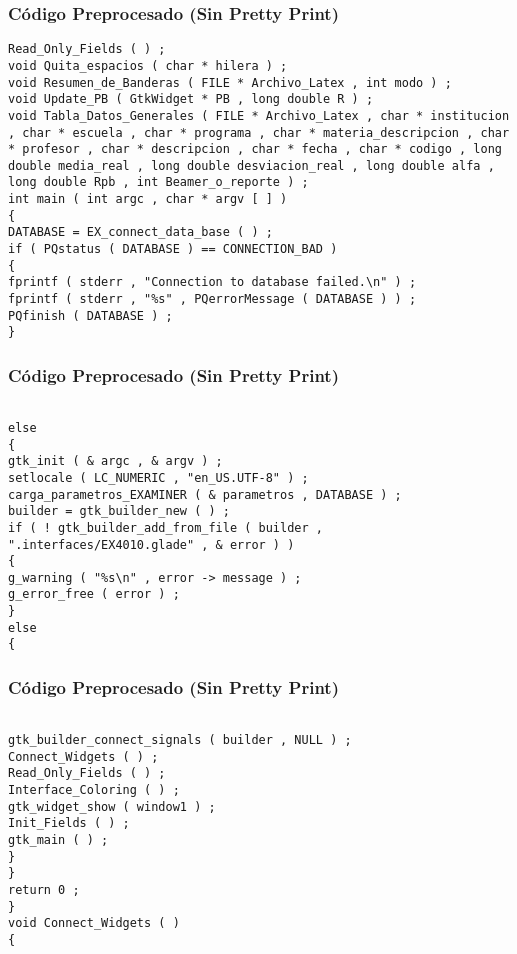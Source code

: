 \documentclass{beamer}
\begin{document}
\begin{frame}[fragile]
\frametitle{C\'odigo Preprocesado (Sin Pretty Print)}
\begin{lstlisting}[style=CStyle]
Read_Only_Fields ( ) ; 
void Quita_espacios ( char * hilera ) ; 
void Resumen_de_Banderas ( FILE * Archivo_Latex , int modo ) ; 
void Update_PB ( GtkWidget * PB , long double R ) ; 
void Tabla_Datos_Generales ( FILE * Archivo_Latex , char * institucion , char * escuela , char * programa , char * materia_descripcion , char * profesor , char * descripcion , char * fecha , char * codigo , long double media_real , long double desviacion_real , long double alfa , long double Rpb , int Beamer_o_reporte ) ; 
int main ( int argc , char * argv [ ] ) 
{ 
DATABASE = EX_connect_data_base ( ) ; 
if ( PQstatus ( DATABASE ) == CONNECTION_BAD ) 
{ 
fprintf ( stderr , "Connection to database failed.\n" ) ; 
fprintf ( stderr , "%s" , PQerrorMessage ( DATABASE ) ) ; 
PQfinish ( DATABASE ) ; 
} \end{lstlisting}
\end{frame}
\begin{frame}[fragile]
\frametitle{C\'odigo Preprocesado (Sin Pretty Print)}
\begin{lstlisting}[style=CStyle]

else 
{ 
gtk_init ( & argc , & argv ) ; 
setlocale ( LC_NUMERIC , "en_US.UTF-8" ) ; 
carga_parametros_EXAMINER ( & parametros , DATABASE ) ; 
builder = gtk_builder_new ( ) ; 
if ( ! gtk_builder_add_from_file ( builder , ".interfaces/EX4010.glade" , & error ) ) 
{ 
g_warning ( "%s\n" , error -> message ) ; 
g_error_free ( error ) ; 
} 
else 
{ \end{lstlisting}
\end{frame}
\begin{frame}[fragile]
\frametitle{C\'odigo Preprocesado (Sin Pretty Print)}
\begin{lstlisting}[style=CStyle]

gtk_builder_connect_signals ( builder , NULL ) ; 
Connect_Widgets ( ) ; 
Read_Only_Fields ( ) ; 
Interface_Coloring ( ) ; 
gtk_widget_show ( window1 ) ; 
Init_Fields ( ) ; 
gtk_main ( ) ; 
} 
} 
return 0 ; 
} 
void Connect_Widgets ( ) 
{ \end{lstlisting}
\end{frame}
\end{document}
